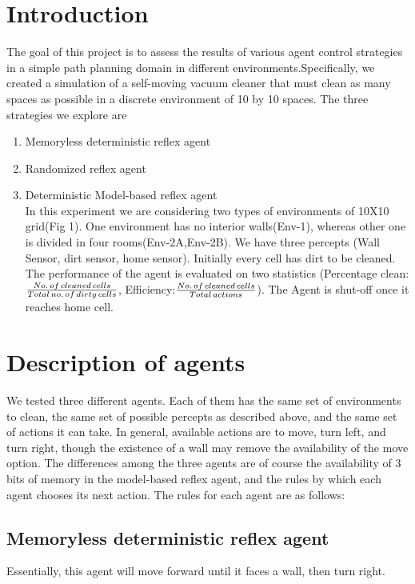 \documentclass{article}
\begin{document}
\section{Introduction}
The goal of this project is to assess the results of various agent control strategies in a simple path planning domain in different environments.Specifically, we created a simulation of a self-moving vacuum cleaner that must clean as many spaces as possible in a discrete environment of 10 by 10 spaces.
The three strategies we explore are
\begin{enumerate}
\item Memoryless deterministic reflex agent
\item Randomized reflex agent
\item Deterministic Model-based reflex agent\\

In this experiment we are considering two types of environments of 10X10 grid(Fig 1).  One environment has no interior walls(Env-1), whereas other one is divided in four rooms(Env-2A,Env-2B).  We have three percepts (Wall Sensor, dirt sensor, home sensor).  Initially every cell has dirt to be cleaned. \\

The performance of the agent is evaluated on two statistics (Percentage clean: $\frac{No.\thinspace  of\thinspace  cleaned \thinspace cells}{Total\thinspace  no.\thinspace  of\thinspace  dirty \thinspace cells}$, Efficiency:$\frac{No.\thinspace  of \thinspace cleaned \thinspace cells}{Total\thinspace actions}$).  The Agent is shut-off once it reaches home cell. 
\end{enumerate}



\section{Description of agents}
We tested three different agents. Each of them has the same set of environments to clean, the same set of possible percepts as described above, and the same set of actions it can take. In general, available actions are to move, turn left, and turn right, though the existence of a wall may remove the availability of the move option. The differences among the three agents are of course the availability of 3 bits of memory in the model-based reflex agent, and the rules by which each agent chooses its next action. The rules for each agent are as follows:

\subsection{Memoryless deterministic reflex agent}
Essentially, this agent will move forward until it faces a wall, then turn right.
\end{document}
